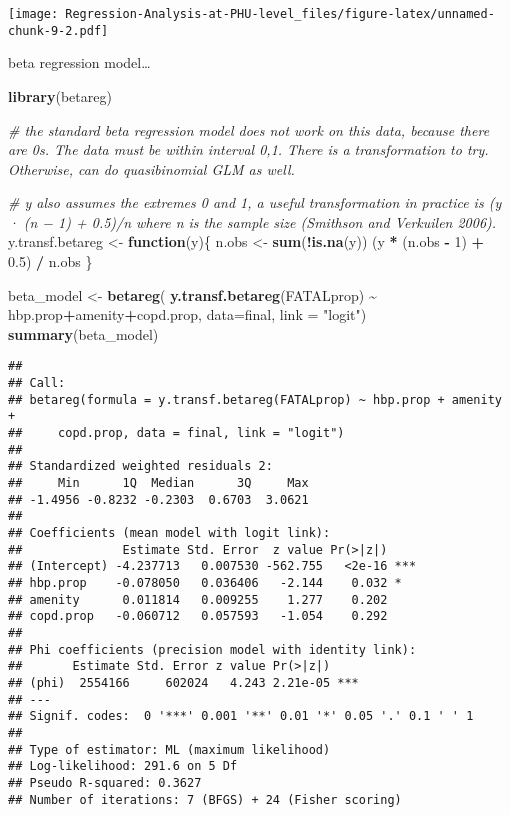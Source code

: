\documentclass[]{article}
\newenvironment{Shaded}{\begin{snugshade}}{\end{snugshade}}
\newcommand{\CommentTok}[1]{\textcolor[rgb]{0.56,0.35,0.01}{\textit{#1}}}
\newcommand{\ControlFlowTok}[1]{\textcolor[rgb]{0.13,0.29,0.53}{\textbf{#1}}}
\newcommand{\DataTypeTok}[1]{\textcolor[rgb]{0.13,0.29,0.53}{#1}}
\newcommand{\DecValTok}[1]{\textcolor[rgb]{0.00,0.00,0.81}{#1}}
\newcommand{\FloatTok}[1]{\textcolor[rgb]{0.00,0.00,0.81}{#1}}
\newcommand{\KeywordTok}[1]{\textcolor[rgb]{0.13,0.29,0.53}{\textbf{#1}}}
\newcommand{\NormalTok}[1]{#1}
\newcommand{\OperatorTok}[1]{\textcolor[rgb]{0.81,0.36,0.00}{\textbf{#1}}}
\newcommand{\StringTok}[1]{\textcolor[rgb]{0.31,0.60,0.02}{#1}}
\begin{document}
\texttt{[image: Regression-Analysis-at-PHU-level\_files/figure-latex/unnamed-chunk-9-2.pdf]}

beta regression model\ldots{}

\begin{Shaded}
\begin{Highlighting}[]
\KeywordTok{library}\NormalTok{(betareg)}

\CommentTok{\# the standard beta regression model does not work on this data, because there are 0\textquotesingle{}s. The data must be within interval 0,1. There is a transformation to try. Otherwise, can do quasibinomial GLM as well.}

\CommentTok{\# y also assumes the extremes 0 and 1, a useful transformation in practice is (y · (n − 1) + 0.5)/n where n is the sample size (Smithson and Verkuilen 2006).}
\NormalTok{y.transf.betareg \textless{}{-}}\StringTok{ }\ControlFlowTok{function}\NormalTok{(y)\{}
\NormalTok{    n.obs \textless{}{-}}\StringTok{ }\KeywordTok{sum}\NormalTok{(}\OperatorTok{!}\KeywordTok{is.na}\NormalTok{(y))}
\NormalTok{    (y }\OperatorTok{*}\StringTok{ }\NormalTok{(n.obs }\OperatorTok{{-}}\StringTok{ }\DecValTok{1}\NormalTok{) }\OperatorTok{+}\StringTok{ }\FloatTok{0.5}\NormalTok{) }\OperatorTok{/}\StringTok{ }\NormalTok{n.obs}
\NormalTok{\}}

\NormalTok{beta\_model \textless{}{-}}\StringTok{ }\KeywordTok{betareg}\NormalTok{( }\KeywordTok{y.transf.betareg}\NormalTok{(FATALprop) }\OperatorTok{\textasciitilde{}}\StringTok{ }\NormalTok{hbp.prop}\OperatorTok{+}\NormalTok{amenity}\OperatorTok{+}\NormalTok{copd.prop, }\DataTypeTok{data=}\NormalTok{final, }\DataTypeTok{link =} \StringTok{"logit"}\NormalTok{)}
\KeywordTok{summary}\NormalTok{(beta\_model)}
\end{Highlighting}
\end{Shaded}

\begin{verbatim}
## 
## Call:
## betareg(formula = y.transf.betareg(FATALprop) ~ hbp.prop + amenity + 
##     copd.prop, data = final, link = "logit")
## 
## Standardized weighted residuals 2:
##     Min      1Q  Median      3Q     Max 
## -1.4956 -0.8232 -0.2303  0.6703  3.0621 
## 
## Coefficients (mean model with logit link):
##              Estimate Std. Error  z value Pr(>|z|)    
## (Intercept) -4.237713   0.007530 -562.755   <2e-16 ***
## hbp.prop    -0.078050   0.036406   -2.144    0.032 *  
## amenity      0.011814   0.009255    1.277    0.202    
## copd.prop   -0.060712   0.057593   -1.054    0.292    
## 
## Phi coefficients (precision model with identity link):
##       Estimate Std. Error z value Pr(>|z|)    
## (phi)  2554166     602024   4.243 2.21e-05 ***
## ---
## Signif. codes:  0 '***' 0.001 '**' 0.01 '*' 0.05 '.' 0.1 ' ' 1 
## 
## Type of estimator: ML (maximum likelihood)
## Log-likelihood: 291.6 on 5 Df
## Pseudo R-squared: 0.3627
## Number of iterations: 7 (BFGS) + 24 (Fisher scoring)
\end{verbatim}
\end{document}
